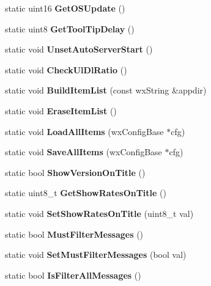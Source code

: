 \begin{DoxyCompactItemize}
\item 
static uint16 {\bfseries GetOSUpdate} ()\label{classCPreferences_a3b70aef82082137b14f4416513c5fef7}

\item 
static uint8 {\bfseries GetToolTipDelay} ()\label{classCPreferences_afa63a93b1ad3550fcf7dc6478eb7a209}

\item 
static void {\bfseries UnsetAutoServerStart} ()\label{classCPreferences_a4d7c875bcd3d3fa89f819500983d4854}

\item 
static void {\bfseries CheckUlDlRatio} ()\label{classCPreferences_af61bcf69301d3c613de57912ac5a4cd4}

\item 
static void {\bf BuildItemList} (const wxString \&appdir)
\item 
static void {\bfseries EraseItemList} ()\label{classCPreferences_aad1ad1afcfc7ebd1dc4a193f859c80b4}

\item 
static void {\bfseries LoadAllItems} (wxConfigBase $\ast$cfg)\label{classCPreferences_a47c57658d0703abae85657641fe47df6}

\item 
static void {\bfseries SaveAllItems} (wxConfigBase $\ast$cfg)\label{classCPreferences_a62abf9dbfd0a6d0d8f6e84411c1fc71f}

\item 
static bool {\bfseries ShowVersionOnTitle} ()\label{classCPreferences_a140ec2ab025fa610261b523c3e72c2eb}

\item 
static uint8\_\-t {\bfseries GetShowRatesOnTitle} ()\label{classCPreferences_abdee599b5c618ed033d72a9ad2d26edb}

\item 
static void {\bfseries SetShowRatesOnTitle} (uint8\_\-t val)\label{classCPreferences_a4baaf7bed2e48dc51dca83a9e4311be8}

\item 
static bool {\bfseries MustFilterMessages} ()\label{classCPreferences_afcec3108eab5edfc8440e00c159031db}

\item 
static void {\bfseries SetMustFilterMessages} (bool val)\label{classCPreferences_a0dac4df578cf45a1233c8d3e516d2e50}

\item 
static bool {\bfseries IsFilterAllMessages} ()\label{classCPreferences_ada2a7f85f11b78e226493fd07ad98d6f}


\end{DoxyCompactItemize}
